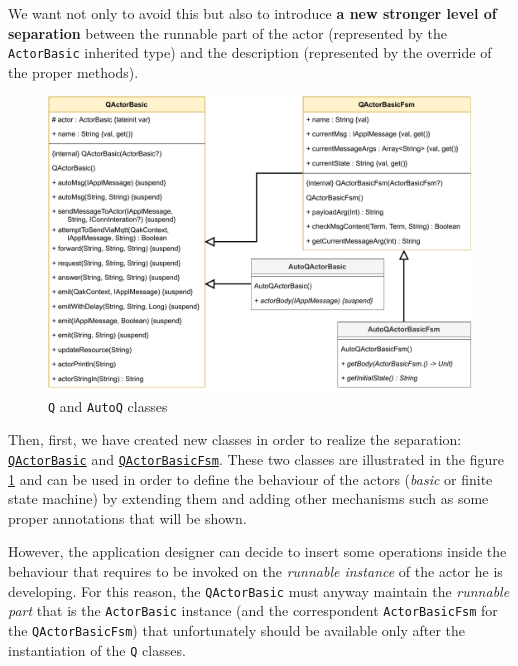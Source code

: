 We want not only to avoid this but also to introduce \textbf{a new stronger level of separation} between the runnable part of the actor (represented by the \texttt{ActorBasic} inherited type) and the description (represented by the override of the proper methods).

\begin{figure}[h]
	\centering
	\includegraphics[width=\textwidth]{img/[UML]QActorBasic_QActorBasicFsm_Auto}
	\caption{\texttt{Q} and \texttt{AutoQ} classes}
	\label{fig::q_autoq_classes}
\end{figure}

Then, first, we have created new classes in order to realize the separation: \href{https://github.com/LM-96/QA-Extensions/blob/main/it.unibo.qakactor/src/main/kotlin/QActorBasic.kt}{\texttt{QActorBasic}} and \href{https://github.com/LM-96/QA-Extensions/blob/main/it.unibo.qakactor/src/main/kotlin/QActorBasicFsm.kt}{\texttt{QActorBasicFsm}}. These two classes are illustrated in the figure \ref{fig::q_autoq_classes} and can be used in order to define the behaviour of the actors (\textit{basic} or finite state machine) by extending them and adding other mechanisms such as some proper annotations that will be shown.

However, the application designer can decide to insert some operations inside the behaviour that requires to be invoked on the \textit{runnable instance} of the actor he is developing. For this reason, the \texttt{QActorBasic} must anyway maintain the \textit{runnable part} that is the \texttt{ActorBasic} instance (and the correspondent \texttt{ActorBasicFsm} for the \texttt{QActorBasicFsm}) that unfortunately should be available only after the instantiation of the \texttt{Q} classes.

